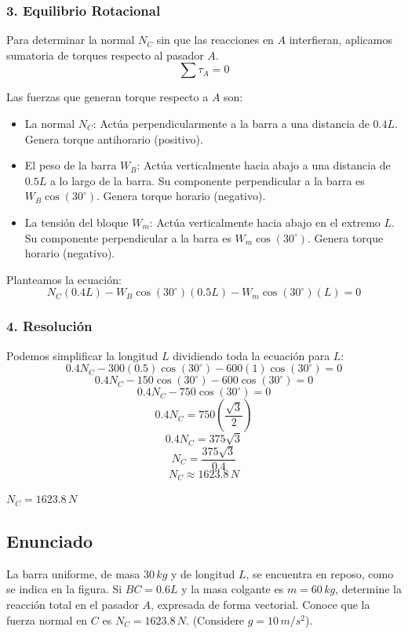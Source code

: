\documentclass[12pt, a4paper]{article}
\begin{document}
\subsubsection*{3. Equilibrio Rotacional}
Para determinar la normal $N_C$ sin que las reacciones en $A$ interfieran, aplicamos sumatoria de torques respecto al pasador $A$.
$$\sum \tau_A = 0$$

Las fuerzas que generan torque respecto a $A$ son:
\begin{itemize}
    \item La normal $N_C$: Actúa perpendicularmente a la barra a una distancia de $0.4L$. Genera torque antihorario (positivo).
    \item El peso de la barra $W_B$: Actúa verticalmente hacia abajo a una distancia de $0.5L$ a lo largo de la barra. Su componente perpendicular a la barra es $W_B \cos(30^\circ)$. Genera torque horario (negativo).
    \item La tensión del bloque $W_m$: Actúa verticalmente hacia abajo en el extremo $L$. Su componente perpendicular a la barra es $W_m \cos(30^\circ)$. Genera torque horario (negativo).
\end{itemize}

Planteamos la ecuación:
$$N_C (0.4L) - W_B \cos(30^\circ) (0.5L) - W_m \cos(30^\circ) (L) = 0$$

\subsubsection*{4. Resolución}
Podemos simplificar la longitud $L$ dividiendo toda la ecuación para $L$:
$$0.4 N_C - 300(0.5)\cos(30^\circ) - 600(1)\cos(30^\circ) = 0$$
$$0.4 N_C - 150 \cos(30^\circ) - 600 \cos(30^\circ) = 0$$
$$0.4 N_C - 750 \cos(30^\circ) = 0$$
$$0.4 N_C = 750 \left( \frac{\sqrt{3}}{2} \right)$$
$$0.4 N_C = 375 \sqrt{3}$$
$$N_C = \frac{375 \sqrt{3}}{0.4}$$
$$N_C \approx 1623.8 \, \si{N}$$

\begin{tcolorbox}[colback=green!5!white, colframe=green!50!black, title=Respuesta Final]
\centering \Large $N_C = 1623.8 \, \si{N}$
\end{tcolorbox}

\newpage

\subsection*{Enunciado}
La barra uniforme, de masa $30 \, \si{kg}$ y de longitud $L$, se encuentra en reposo, como se indica en la figura. Si $BC = 0.6 L$ y la masa colgante es $m = 60 \, \si{kg}$, determine la reacción total en el pasador $A$, expresada de forma vectorial. Conoce que la fuerza normal en $C$ es $N_C = 1623.8 \, \si{N}$. (Considere $g = 10 \, \si{m/s^2}$).
\end{document}
